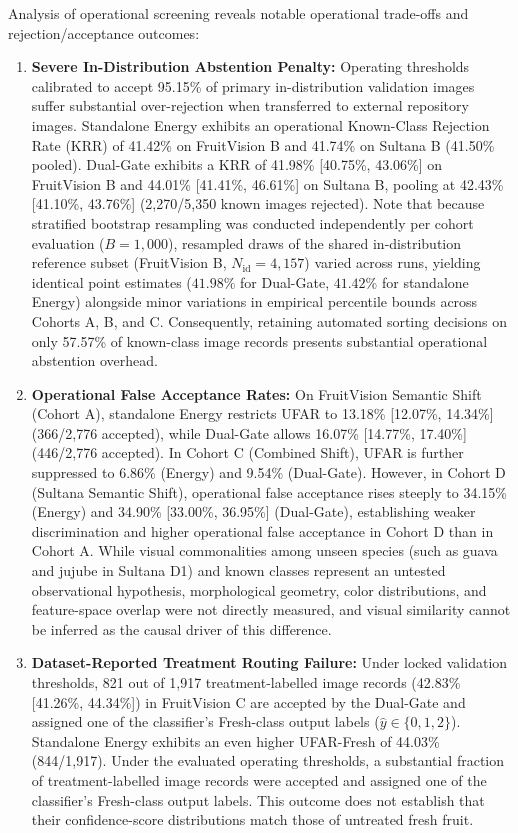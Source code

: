 Analysis of operational screening reveals notable operational trade-offs and rejection/acceptance outcomes:
\begin{enumerate}
\setlength{\itemsep}{0pt}
\setlength{\parsep}{0pt}
\setlength{\parskip}{0pt}
\setlength{\topsep}{1pt}
\setlength{\partopsep}{0pt}
\item \textbf{Severe In-Distribution Abstention Penalty:} Operating thresholds calibrated to accept 95.15\% of primary in-distribution validation images suffer substantial over-rejection when transferred to external repository images. Standalone Energy exhibits an operational Known-Class Rejection Rate (KRR) of 41.42\% on FruitVision B and 41.74\% on Sultana B (41.50\% pooled). Dual-Gate exhibits a KRR of 41.98\% [40.75\%, 43.06\%] on FruitVision B and 44.01\% [41.41\%, 46.61\%] on Sultana B, pooling at 42.43\% [41.10\%, 43.76\%] (2,270/5,350 known images rejected). Note that because stratified bootstrap resampling was conducted independently per cohort evaluation ($B = 1,000$), resampled draws of the shared in-distribution reference subset (FruitVision B, $N_{\text{id}} = 4,157$) varied across runs, yielding identical point estimates ($41.98\%$ for Dual-Gate, $41.42\%$ for standalone Energy) alongside minor variations in empirical percentile bounds across Cohorts A, B, and C. Consequently, retaining automated sorting decisions on only 57.57\% of known-class image records presents substantial operational abstention overhead.
\item \textbf{Operational False Acceptance Rates:} On FruitVision Semantic Shift (Cohort A), standalone Energy restricts UFAR to 13.18\% [12.07\%, 14.34\%] (366/2,776 accepted), while Dual-Gate allows 16.07\% [14.77\%, 17.40\%] (446/2,776 accepted). In Cohort C (Combined Shift), UFAR is further suppressed to 6.86\% (Energy) and 9.54\% (Dual-Gate). However, in Cohort D (Sultana Semantic Shift), operational false acceptance rises steeply to 34.15\% (Energy) and 34.90\% [33.00\%, 36.95\%] (Dual-Gate), establishing weaker discrimination and higher operational false acceptance in Cohort D than in Cohort A. While visual commonalities among unseen species (such as guava and jujube in Sultana D1) and known classes represent an untested observational hypothesis, morphological geometry, color distributions, and feature-space overlap were not directly measured, and visual similarity cannot be inferred as the causal driver of this difference.
\item \textbf{Dataset-Reported Treatment Routing Failure:} Under locked validation thresholds, 821 out of 1,917 treatment-labelled image records (42.83\% [41.26\%, 44.34\%]) in FruitVision C are accepted by the Dual-Gate and assigned one of the classifier's Fresh-class output labels ($\hat{y} \in \{0, 1, 2\}$). Standalone Energy exhibits an even higher UFAR-Fresh of 44.03\% (844/1,917). Under the evaluated operating thresholds, a substantial fraction of treatment-labelled image records were accepted and assigned one of the classifier's Fresh-class output labels. This outcome does not establish that their confidence-score distributions match those of untreated fresh fruit.

\end{enumerate}
